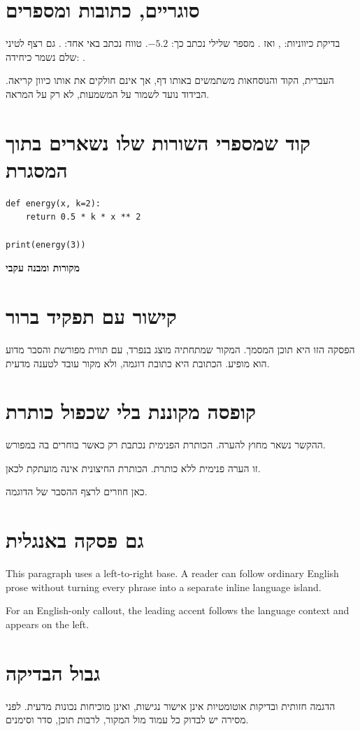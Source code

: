 \section{סוגריים, כתובות ומספרים}
בדיקת כיווניות: , ואז . מספר שלילי נכתב
כך: $-5.2$. טווח נכתב באי אחד: . גם רצף לטיני שלם נשמר
כיחידה: .
\begin{keybox}[frametitle={קריאה משולבת}]
העברית, הקוד והנוסחאות משתמשים באותו דף, אך אינם חולקים את אותו כיוון
קריאה. הבידוד נועד לשמור על המשמעות, לא רק על המראה.
\end{keybox}
\section{קוד שמספרי השורות שלו נשארים בתוך המסגרת}
\begin{codebox}[frametitle={\en{Python}}]
\begin{asmblock}
\begin{lstlisting}[style=pystyle]
def energy(x, k=2):
    return 0.5 * k * x ** 2

print(energy(3))
\end{lstlisting}
\end{asmblock}
\end{codebox}
\newpage
{\LARGE\sffamily\bfseries\noindent מקורות ומבנה עקבי\par}\medskip
\section{קישור עם תפקיד ברור}
הפסקה הזו היא תוכן המסמך. המקור שמתחתיה מוצג בנפרד, עם תווית מפורשת
והסבר מדוע הוא מופיע. הכתובת היא כתובת דוגמה, ולא מקור עובד לטענה מדעית.
\section{קופסה מקוננת בלי שכפול כותרת}
\begin{exbox}[frametitle={הכותרת החיצונית}]
ההקשר נשאר מחוץ להערה. הכותרת הפנימית נכתבת רק כאשר בוחרים בה במפורש.
\begin{notebox}
זו הערה פנימית ללא כותרת. הכותרת החיצונית אינה מועתקת לכאן.
\end{notebox}
כאן חוזרים לרצף ההסבר של הדוגמה.
\end{exbox}
\section{גם פסקה באנגלית}
\begin{englishprose}
This paragraph uses a left-to-right base. A reader can follow ordinary English
prose without turning every phrase into a separate inline language island.
\begin{notebox}[frametitle={English note}]
For an English-only callout, the leading accent follows the language context and appears on the left.
\end{notebox}
\end{englishprose}
\section{גבול הבדיקה}
הדגמה חזותית ובדיקות אוטומטיות אינן אישור נגישות, ואינן מוכיחות נכונות
מדעית. לפני מסירה יש לבדוק כל עמוד מול המקור, לרבות תוכן, סדר וסימנים.

